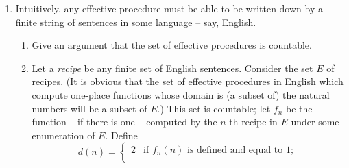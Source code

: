 {\begin{enumerate}
\begin{enumerate}
	\item Let $\Gamma$ be a possibly infinite set of sentences of \lone\ such that $\Gamma \vDash$. Show that there is a finite disjunction, $\delta$, each disjunct of which is the negation of a sentence in $\Gamma$, and such that $\vDash \delta$.
	\item Consider the following relation holding between sets of sentences: \begin{quote} Where $\Gamma$ and $\Delta$ are any sets of sentences,
		$\Gamma \vDash^{\!\star} \Delta$ is correct iff every structure which satisfies \emph{every} $\gamma \in \Gamma$ is also one which satisfies \emph{at least one} $\delta \in \Delta$.
	\end{quote}Show that if $\Gamma \vDash^{\!\star} \Delta$, there is a finite conjunction of \lone\ sentences in $\Gamma$, $$\Phi = (\phi_{1}\wedge \ldots \wedge \phi_{n}),$$ and a finite disjunction of \lone\ sentences in $\Delta$, $$\Psi = (\psi_{1} \vee \ldots\vee \psi_{n}),$$ such that $\Phi \vDash \Psi$. (You may assume the Compactness theorem.) 
	\item A set of sentences of English is \emph{compossible} just in case it is possible for them all to be true together. An analogue for the compactness theorem in English would be: for every infinite set $E$ of English sentences not all compossible, there is a finite subset of $E$ whose members are not all compossible. \begin{enumerate}
		\item Show that this analogue of compactness fails for English.
		\item What does this show about translations from English into \lone?
	\end{enumerate}
\end{enumerate}
\item Intuitively, any effective procedure must be able to be written down by a finite string of sentences in some language – say, English. \begin{enumerate}
	\item Give an argument that the set of effective procedures is countable.
	\item Let a \emph{recipe} be any finite set of English sentences.
		Consider the set $E$ of recipes. (It is obvious that the set of effective procedures in English which compute one-place functions whose domain is (a subset of) the natural numbers will be a subset of $E$.)  This set is countable; let $f_{n}$ be the function – if there is one – computed by the $n$-th recipe in $E$ under some enumeration of $E$. Define $$d(n)=\begin{cases}2 &\text{if $f_{n}(n)$ is defined and equal to $1$};\\

\end{cases}$$
\end{enumerate}
\end{enumerate}}
